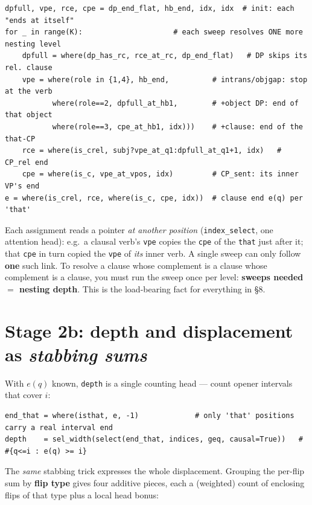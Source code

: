 \documentclass[11pt]{article}
\newcommand{\code}[1]{\texttt{#1}}
\begin{document}
\begin{lstlisting}
dpfull, vpe, rce, cpe = dp_end_flat, hb_end, idx, idx  # init: each "ends at itself"
for _ in range(K):                     # each sweep resolves ONE more nesting level
    dpfull = where(dp_has_rc, rce_at_rc, dp_end_flat)   # DP skips its rel. clause
    vpe = where(role in {1,4}, hb_end,          # intrans/objgap: stop at the verb
           where(role==2, dpfull_at_hb1,        # +object DP: end of that object
           where(role==3, cpe_at_hb1, idx)))    # +clause: end of the that-CP
    rce = where(is_crel, subj?vpe_at_q1:dpfull_at_q1+1, idx)   # CP_rel end
    cpe = where(is_c, vpe_at_vpos, idx)         # CP_sent: its inner VP's end
e = where(is_crel, rce, where(is_c, cpe, idx))  # clause end e(q) per 'that'
\end{lstlisting}

\begin{rulebox}
Each assignment reads a pointer \emph{at another position} (\code{index\_select}, one attention
head): e.g.\ a clausal verb's \code{vpe} copies the \code{cpe} of the \code{that} just after it;
that \code{cpe} in turn copied the \code{vpe} of \emph{its} inner verb. A single sweep can only
follow \textbf{one} such link. To resolve a clause whose complement is a clause whose complement
is a clause, you must run the sweep once per level: \textbf{sweeps needed $=$ nesting depth}. This
is the load-bearing fact for everything in \S8.
\end{rulebox}

\section{Stage 2b: depth and displacement as \emph{stabbing sums}}

With $e(q)$ known, \code{depth} is a single counting head --- count opener intervals that cover $i$:

\begin{lstlisting}
end_that = where(isthat, e, -1)             # only 'that' positions carry a real interval end
depth    = sel_width(select(end_that, indices, geq, causal=True))   # #{q<=i : e(q) >= i}
\end{lstlisting}

\noindent The \emph{same} stabbing trick expresses the whole displacement. Grouping the per-flip sum
by \textbf{flip type} gives four additive pieces, each a (weighted) count of enclosing flips of that
type plus a local head bonus:
\end{document}
